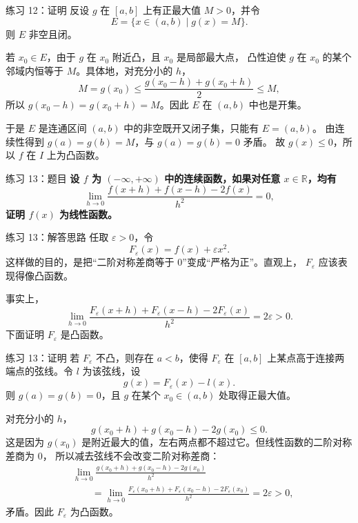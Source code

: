 \documentclass[aspectratio=169,11pt]{ctexbeamer}
\newcommand{\R}{\mathbb{R}}
\begin{document}
\begin{frame}{练习 12：证明}
\small
反设 $g$ 在 $[a,b]$ 上有正最大值 $M>0$，并令
\[
  E=\{x\in(a,b)\mid g(x)=M\}.
\]
则 $E$ 非空且闭。

若 $x_0\in E$，由于 $g$ 在 $x_0$ 附近凸，且 $x_0$ 是局部最大点，
凸性迫使 $g$ 在 $x_0$ 的某个邻域内恒等于 $M$。具体地，对充分小的 $h$，
\[
  M=g(x_0)\le \frac{g(x_0-h)+g(x_0+h)}2\le M,
\]
所以 $g(x_0-h)=g(x_0+h)=M$。因此 $E$ 在 $(a,b)$ 中也是开集。

于是 $E$ 是连通区间 $(a,b)$ 中的非空既开又闭子集，只能有 $E=(a,b)$。
由连续性得到 $g(a)=g(b)=M$，与 $g(a)=g(b)=0$ 矛盾。
故 $g(x)\le0$，所以 $f$ 在 $I$ 上为凸函数。
\end{frame}

\begin{frame}{练习 13：题目}
\small
\textbf{设 $f$ 为 $(-\infty,+\infty)$ 中的连续函数，如果对任意
$x\in\R$，均有}
\[
  \lim_{h\to0}
  \frac{f(x+h)+f(x-h)-2f(x)}{h^2}=0,
\]
\textbf{证明 $f(x)$ 为线性函数。}
\end{frame}

\begin{frame}{练习 13：解答思路}
\small
任取 $\varepsilon>0$，令
\[
  F_\varepsilon(x)=f(x)+\varepsilon x^2.
\]
这样做的目的，是把“二阶对称差商等于 $0$”变成“严格为正”。直观上，
$F_\varepsilon$ 应该表现得像凸函数。

事实上，
\[
  \lim_{h\to0}
  \frac{F_\varepsilon(x+h)+F_\varepsilon(x-h)-2F_\varepsilon(x)}{h^2}
  =2\varepsilon>0.
\]
下面证明 $F_\varepsilon$ 是凸函数。
\end{frame}

\begin{frame}{练习 13：证明}
\small
若 $F_\varepsilon$ 不凸，则存在 $a<b$，使得 $F_\varepsilon$ 在 $[a,b]$
上某点高于连接两端点的弦线。令 $l$ 为该弦线，设
\[
  g(x)=F_\varepsilon(x)-l(x).
\]
则 $g(a)=g(b)=0$，且 $g$ 在某个 $x_0\in(a,b)$ 处取得正最大值。

对充分小的 $h$，
\[
  g(x_0+h)+g(x_0-h)-2g(x_0)\le0.
\]
这是因为 $g(x_0)$ 是附近最大的值，左右两点都不超过它。但线性函数的二阶对称差商为 $0$，
所以减去弦线不会改变二阶对称差商：
\[
\begin{aligned}
&\lim_{h\to0}
\frac{g(x_0+h)+g(x_0-h)-2g(x_0)}{h^2}\\
&\qquad =
\lim_{h\to0}
\frac{F_\varepsilon(x_0+h)+F_\varepsilon(x_0-h)-2F_\varepsilon(x_0)}{h^2}
=2\varepsilon>0,
\end{aligned}
\]
矛盾。因此 $F_\varepsilon$ 为凸函数。
\end{frame}
\end{document}
